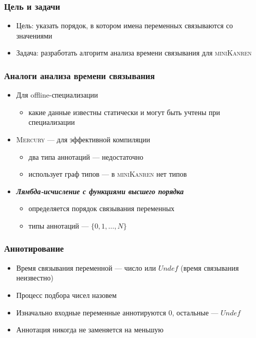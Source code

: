 \documentclass{beamer}
\newcommand{\miniKanren}{\textsc{miniKanren}}
\newcommand{\mercury}{\textsc{Mercury}}
\begin{document}
\begin{frame}\frametitle{Цель и задачи}
\begin{itemize}
    \item Цель: указать порядок, в котором имена переменных связываются со значениями
    \item Задача: разработать алгоритм анализа времени связывания для \miniKanren{}
\end{itemize}
\end{frame}

\begin{frame}\frametitle{Аналоги анализа времени связывания}
\begin{itemize}
    \item Для offline-специализации
        \begin{itemize}
            \item какие данные известны статически и могут быть учтены при специализации
        \end{itemize}
    \item \mercury{} --- для эффективной компиляции
        \begin{itemize}
            \item два типа аннотаций --- недостаточно
            \item использует граф типов --- в \miniKanren{} нет типов
        \end{itemize}
    \item \textbf{\emph{Лямбда-исчисление с функциями высшего порядка}}
        \begin{itemize}
            \item определяется порядок связывания переменных
            \item типы аннотаций --- $\{ 0, 1, \dots, N\}$
        \end{itemize}
\end{itemize}
\end{frame}

\begin{frame}\frametitle{Аннотирование}
\begin{itemize}
    \item Время связывания переменной --- число или $Undef$ (время связывания неизвестно)
    \item Процесс подбора чисел назовем \textit{}
    \item Изначально входные переменные аннотируются $0$, остальные --- $Undef$ 
    \item Аннотация никогда не заменяется на меньшую
\end{itemize}
\end{frame}
\end{document}
